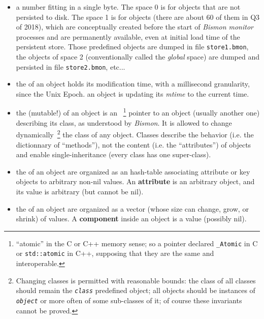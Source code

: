 \begin{itemize}
  \item a  number fitting in a single
    byte. The space 0 is for 
    objects that are not persisted to disk. The space 1 is for
     objects (there are about 60
    of them in Q3 of 2018), which are conceptually created before the
    start of \emph{Bismon monitor} processes and are permanently
    available, even at initial load time of the persistent
    store. Those predefined objects are dumped in file
    \texttt{store1.bmon}, the objects of space 2 (conventionally
    called the \emph{global} space) are dumped and persisted in file
    \texttt{store2.bmon}, etc...

    \item the  of an object holds its
      modification time, with a millisecond granularity, since the
      Unix Epoch.  an object is updating its
      \emph{mtime} to the current time.

    \item the (mutable!)  of an object is
      an ~\footnote{``atomic'' in the C
        or C++ memory sense; so a pointer declared \texttt{\_Atomic}
        in C or \texttt{std::atomic} in C++, supposing that they are
        the same and interoperable.} pointer to an object (usually
      another one) describing its class, as understood by
      \emph{Bismon}. It is allowed to change
      dynamically~\footnote{Changing classes is permitted with
        reasonable bounds: the class of all classes should remain the
        \emph{\texttt{class}} predefined object; all objects should be
        instances of \emph{\texttt{object}} or more often of some
        sub-classes of it; of course these invariants cannot be
        proved.} the class of any object. Classes describe the
      behavior (i.e. the dictionnary of ``methods''), not the content
      (i.e. the ``attributes'') of objects and enable
      single-inheritance (every class has one super-class).

    \item the  of an object are
      organized as an hash-table associating attribute or key objects
      to arbitrary non-nil values. An \textbf{attribute} is an
      arbitrary object, and its value is arbitrary (but cannot be
      nil).

    \item the  of an object are
      organized as a vector (whose size can change, grow, or shrink)
      of values. A \textbf{component} inside an object is a value
      (possibly nil).


\end{itemize}
